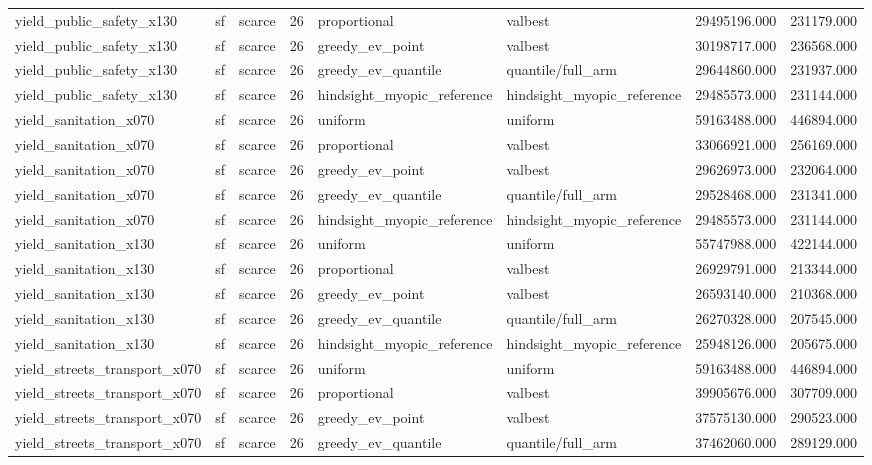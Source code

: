 \begin{tabular}{lllrllrr}
yield\_public\_safety\_x130 & sf & scarce & 26 & proportional & valbest & 29495196.000 & 231179.000 \\
yield\_public\_safety\_x130 & sf & scarce & 26 & greedy\_ev\_point & valbest & 30198717.000 & 236568.000 \\
yield\_public\_safety\_x130 & sf & scarce & 26 & greedy\_ev\_quantile & quantile/full\_arm & 29644860.000 & 231937.000 \\
yield\_public\_safety\_x130 & sf & scarce & 26 & hindsight\_myopic\_reference & hindsight\_myopic\_reference & 29485573.000 & 231144.000 \\
yield\_sanitation\_x070 & sf & scarce & 26 & uniform & uniform & 59163488.000 & 446894.000 \\
yield\_sanitation\_x070 & sf & scarce & 26 & proportional & valbest & 33066921.000 & 256169.000 \\
yield\_sanitation\_x070 & sf & scarce & 26 & greedy\_ev\_point & valbest & 29626973.000 & 232064.000 \\
yield\_sanitation\_x070 & sf & scarce & 26 & greedy\_ev\_quantile & quantile/full\_arm & 29528468.000 & 231341.000 \\
yield\_sanitation\_x070 & sf & scarce & 26 & hindsight\_myopic\_reference & hindsight\_myopic\_reference & 29485573.000 & 231144.000 \\
yield\_sanitation\_x130 & sf & scarce & 26 & uniform & uniform & 55747988.000 & 422144.000 \\
yield\_sanitation\_x130 & sf & scarce & 26 & proportional & valbest & 26929791.000 & 213344.000 \\
yield\_sanitation\_x130 & sf & scarce & 26 & greedy\_ev\_point & valbest & 26593140.000 & 210368.000 \\
yield\_sanitation\_x130 & sf & scarce & 26 & greedy\_ev\_quantile & quantile/full\_arm & 26270328.000 & 207545.000 \\
yield\_sanitation\_x130 & sf & scarce & 26 & hindsight\_myopic\_reference & hindsight\_myopic\_reference & 25948126.000 & 205675.000 \\
yield\_streets\_transport\_x070 & sf & scarce & 26 & uniform & uniform & 59163488.000 & 446894.000 \\
yield\_streets\_transport\_x070 & sf & scarce & 26 & proportional & valbest & 39905676.000 & 307709.000 \\
yield\_streets\_transport\_x070 & sf & scarce & 26 & greedy\_ev\_point & valbest & 37575130.000 & 290523.000 \\
yield\_streets\_transport\_x070 & sf & scarce & 26 & greedy\_ev\_quantile & quantile/full\_arm & 37462060.000 & 289129.000 \\

\end{tabular}
